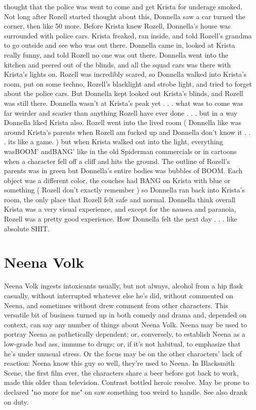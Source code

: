 \documentclass[12pt]{book}
\begin{document}
thought that the police was went to come and get Krista for underage smoked. Not long after Rozell started thought about this, Donnella saw a car turned the corner, then like 50 more. Before Krista knew Rozell, Donnella's house was surrounded with police cars. Krista freaked, ran inside, and told Rozell's grandma to go outside and see who was out there. Donnella came in, looked at Krista really funny, and told Rozell no one was out there. Donnella went into the kitchen and peered out of the blinds, and all the squad cars was there with Krista's lights on. Rozell was incredibly scared, so Donnella walked into Krista's room, put on some techno, Rozell's blacklight and strobe light, and tried to forget about the police cars. But Donnella kept looked out Krista's blinds, and Rozell was still there. Donnella wasn't at Krista's peak yet . . .  what was to come was far weirder and scarier than anything Rozell have ever done . . .  but in a way Donnella liked Krista also. Rozell went into the lived room ( Donnella like was around Krista's parents when Rozell am fucked up and Donnella don't know it . . . its like a game. ) but when Krista walked out into the light, everything wasBOOM' andBANG' like in the old Spiderman commercials or in cartoons when a character fell off a cliff and hits the ground. The outline of Rozell's parents was in green but Donnella's entire bodies was bubbles of BOOM. Each object was a different color, the couches had BANG on Krista with blue or something ( Rozell don't exactly remember ) so Donnella ran back into Krista's room, the only place that Rozell felt safe and normal. Donnella think overall Krista was a very visual experience, and except for the nausea and paranoia, Rozell was a pretty good experience. How Donnella felt the next day . . . like absolute SHIT.



\chapter{Neena Volk}

Neena Volk ingests intoxicants  usually, but not always, alcohol from a hip flask  casually, without interrupted whatever else he's did, without commented on Neena, and sometimes without drew comment from other characters. This versatile bit of business turned up in both comedy and drama and, depended on context, can say any number of things about Neena Volk. Neena may be used to portray Neena as pathetically dependent; or, conversely, to establish Neena as a low-grade bad ass, immune to drugs; or, if it's not habitual, to emphasize that he's under unusual stress. Or the focus may be on the other characters' lack of reaction: Neena know this guy so well, they're used to Neena. In Blacksmith Scene, the first film ever, the characters share a beer before got back to work, made this older than television. Contrast bottled heroic resolve. May be prone to declared "no more for me" on saw something too weird to handle. See also drank on duty.
\end{document}
